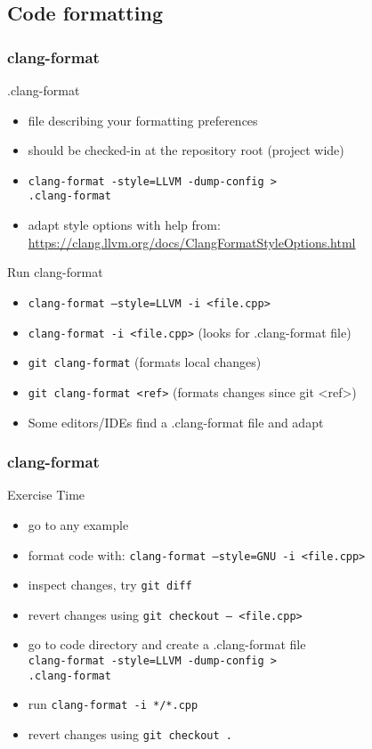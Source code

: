 \subsection[format]{Code formatting}

\begin{frame}[fragile]
\frametitle{clang-format}
\begin{block}{.clang-format}
	\begin{itemize}
		\item file describing your formatting preferences
		\item should be checked-in at the repository root (project wide)
		\item \texttt{clang-format -style=LLVM -dump-config >} \\
		  \texttt{.clang-format}
		\item adapt style options with help from: \url{https://clang.llvm.org/docs/ClangFormatStyleOptions.html}
	\end{itemize}
\end{block}
\begin{block}{Run clang-format}
	\begin{itemize}
		\item \texttt{clang-format --style=LLVM -i <file.cpp>}
		\item \texttt{clang-format -i <file.cpp>} (looks for .clang-format file)
		\item \texttt{git clang-format} (formats local changes)
		\item \texttt{git clang-format <ref>} (formats changes since git \textless{}ref\textgreater{})
		\item Some editors/IDEs find a .clang-format file and adapt
	\end{itemize}
\end{block}
\end{frame}

\begin{frame}[fragile]
\frametitle{clang-format}
\begin{alertblock}{Exercise Time}
	\begin{itemize}
		\item go to any example
		\item format code with: \texttt{clang-format --style=GNU -i <file.cpp>}
		\item inspect changes, try \texttt{git diff}
		\item revert changes using \texttt{git checkout -- <file.cpp>}
		\item go to code directory and create a .clang-format file \\
		  \texttt{clang-format -style=LLVM -dump-config >} \\
		  \texttt{.clang-format}
		\item run \texttt{clang-format -i */*.cpp}
		\item revert changes using \texttt{git checkout .}
	\end{itemize}
\end{alertblock}
\end{frame}

